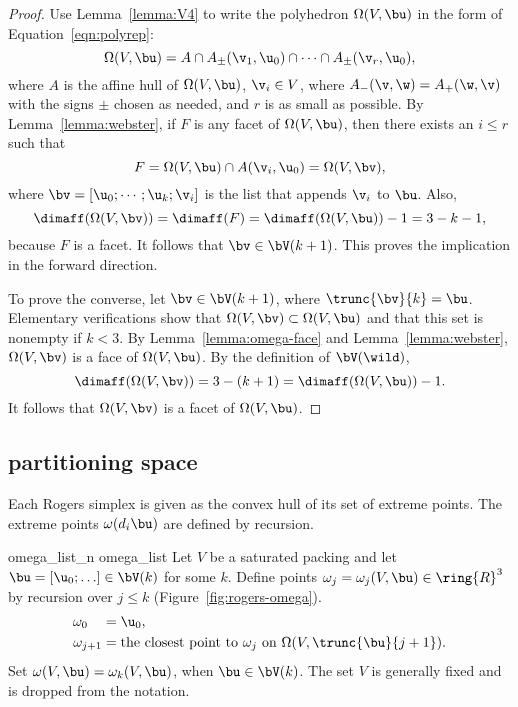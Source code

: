 \begin{proof} 
  Use Lemma~\ref{lemma:V4} to write the polyhedron $\Omega(V,\bu)$ in
  the form of Equation~\ref{eqn:polyrep}:
\[  
\Omega(V,\bu) = A \cap A_\pm(\v_1,\u_0) \cap \cdots\cap A_\pm(\v_r,\u_0),
\] 
where $A$ is the affine hull of $\Omega(V,\bu)$, $\v_i\in V$, where
$A_-(\v,\w) = A_+(\w,\v)$ with the signs $\pm$ chosen as needed, and
$r$ is as small as possible.  By Lemma~\ref{lemma:webster}, if $F$ is
any facet of $\Omega(V,\bu)$, then there exists an $i\le r$ such that
\[  
F = \Omega(V,\bu) \cap A(\v_i,\u_0) = \Omega(V,\bv),
\] 
where $\bv = [\u_0;\cdots;\u_k;\v_i]$ is the list that appends $\v_i$
to $\bu$.  Also,
\[  
\dimaff(\Omega(V,\bv)) = \dimaff(F) = \dimaff(\Omega(V,\bu)) - 1 = 3 - k - 1,
\] 
because $F$ is a facet.  It follows that $\bv \in \bV(k+1)$.  This
proves the implication in the forward direction.

To prove the converse, let $\bv\in \bV(k+1)$, where $\trunc{\bv}{k} =
\bu$.  Elementary verifications show that $\Omega(V,\bv)\subset
\Omega(V,\bu)$ and that this set is nonempty if $k<3$.  By
Lemma~\ref{lemma:omega-face} and Lemma~\ref{lemma:webster},
$\Omega(V,\bv)$ is a face of $\Omega(V,\bu)$.  By the definition of
$\bV(\wild )$,
\[  
\dimaff(\Omega(V,\bv)) = 3 - (k+1) = \dimaff(\Omega(V,\bu)) -1.
\] 
It follows that $\Omega(V,\bv)$ is a facet of $\Omega(V,\bu)$.
\end{proof}


\subsection{partitioning space}

Each Rogers simplex is given as the convex hull of  its set of extreme points.  
The extreme points $\omega(d_i\bu)$
are defined by recursion.

\begin{definition}[$\omega$]\label{def:omega}
   {omega\_list\_n} \formaldef{$\omega$}
  {omega\_list} Let $V$ be a saturated packing and let
  $\bu=[\u_0;\ldots]\in \bV(k)$ for some $k$.  Define points
  $\omega_j=\omega_j(V,\bu)\in\ring{R}^3$ by recursion over $j\le k$
  (Figure~\ref{fig:rogers-omega}).
\begin{align*}
\omega_{0\phantom{+1}} &= \u_0,\\
\omega_{j+1} &=\text{the closest point to } \omega_j 
\text{ on }\Omega(V,\trunc{\bu}{j+1}).
\end{align*}
Set $\omega(V,\bu) = \omega_{k}(V,\bu)$, when $\bu\in \bV(k)$.  The
set $V$ is generally fixed and is dropped from the notation.
\end{definition}

